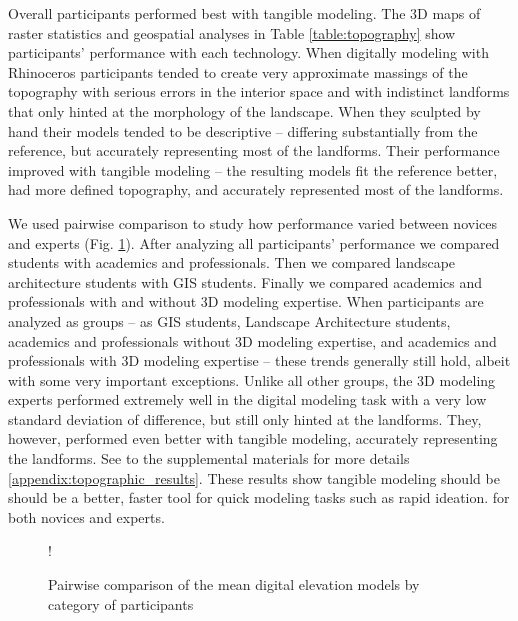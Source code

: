 \documentclass[Afour,sageh,times]{sagej}
\begin{document}
Overall participants performed best with tangible modeling.
%
The 3D maps of raster statistics and geospatial analyses in
Table \ref{table:topography} 
show participants' performance with each technology.
%
When digitally modeling with Rhinoceros 
participants tended to 
create very approximate massings of the topography
with serious errors in the interior space and
with indistinct landforms
that only hinted at the morphology of the landscape.
%
When they sculpted by hand
their models tended to be descriptive -- 
differing substantially from the reference, but
accurately representing most of the landforms. 
%
Their performance improved 
with tangible modeling --
the resulting models
fit the reference better, 
had more defined topography, 
and accurately represented most of the landforms.

We used pairwise comparison to study 
how performance varied between 
novices and experts (Fig. \ref{fig:comparison}).
After analyzing all participants' performance
we compared students with academics and professionals. 
Then we compared landscape architecture students with GIS students.
Finally we compared academics and professionals 
with and without 3D modeling expertise.
%
When participants are analyzed as groups 
-- as GIS students, Landscape Architecture students, 
academics and professionals without 3D modeling expertise, 
and academics and professionals with 3D modeling expertise -- 
these trends generally still hold, 
albeit with some very important exceptions.
%
Unlike all other groups, 
the 3D modeling experts performed extremely well 
in the digital modeling task
with a very low standard deviation of difference, 
but still only hinted at the landforms. 
They, however, performed even better with tangible modeling,
accurately representing the landforms. 
%
See to the supplemental materials for more details
\ref{appendix:topographic_results}.
%
These results show 
tangible modeling should be 
should be a better, faster tool 
for quick modeling tasks such as rapid ideation. 
for both novices and experts.

\begin{figure}[t]
\resizebox {\textwidth} {!} {}
\caption{Pairwise comparison of the mean digital elevation models by category of participants}
\label{fig:comparison}
\end{figure}


\end{document}
